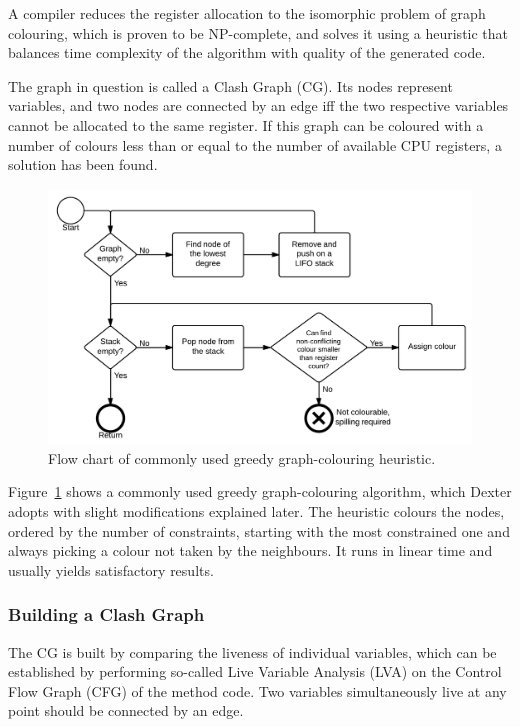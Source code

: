 \documentclass[12pt,twoside,notitlepage]{report}
\begin{document}
A compiler reduces the register allocation to the isomorphic problem of graph colouring, which is proven to be NP-complete, and solves it using a heuristic that balances time complexity of the algorithm with quality of the generated code. 

The graph in question is called a Clash Graph (CG). Its nodes represent variables, and two nodes are connected by an edge iff the two respective variables cannot be allocated to the same register. If this graph can be coloured with a number of colours less than or equal to the number of available CPU registers, a solution has been found. 

\begin{figure}
	\centerline{	
		\includegraphics[width=\textwidth]{figs/fig_implementation_gc.png}
	}
	\caption{Flow chart of commonly used greedy graph-colouring heuristic.}
	\label{fig:Implementation_GraphColouring}
\end{figure}

Figure~\ref{fig:Implementation_GraphColouring} shows a commonly used greedy graph-colouring algorithm, which Dexter adopts with slight modifications explained later. The heuristic colours the nodes, ordered by the number of constraints, starting with the most constrained one and always picking a colour not taken by the neighbours. It runs in linear time and usually yields satisfactory results.

\subsubsection{Building a Clash Graph}

The CG is built by comparing the liveness of individual variables, which can be established by performing so-called Live Variable Analysis (LVA) on the Control Flow Graph (CFG) of the method code. Two variables simultaneously live at any point should be connected by an edge.
\end{document}
